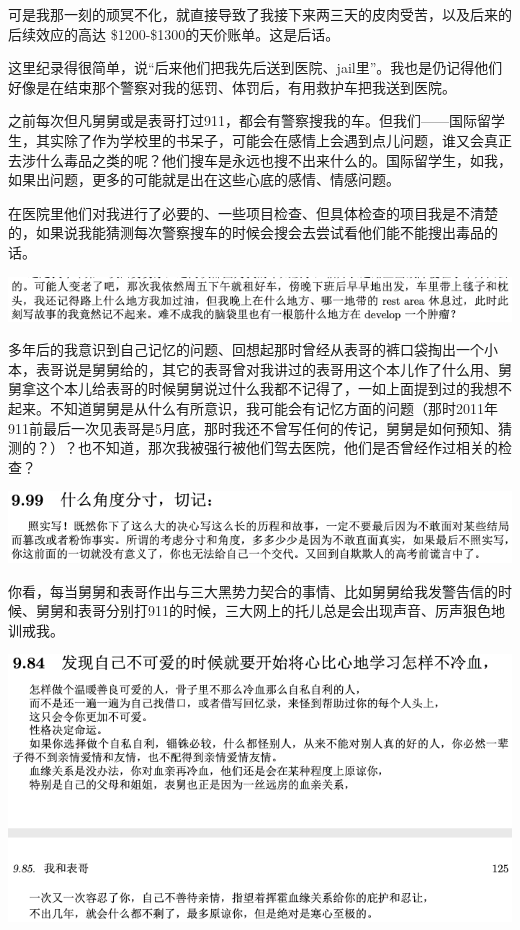 \documentclass[9pt, b5paper]{article}
\begin{document}
可是我那一刻的顽冥不化，就直接导致了我接下来两三天的皮肉受苦，以及后来的后续效应的高达 \$1200-\$1300的天价账单。这是后话。 

这里纪录得很简单，说“后来他们把我先后送到医院、jail里”。我也是仍记得他们好像是在结束那个警察对我的惩罚、体罚后，有用救护车把我送到医院。

之前每次但凡舅舅或是表哥打过911，都会有警察搜我的车。但我们——国际留学生，其实除了作为学校里的书呆子，可能会在感情上会遇到点儿问题，谁又会真正去涉什么毒品之类的呢？他们搜车是永远也搜不出来什么的。国际留学生，如我，如果出问题，更多的可能就是出在这些心底的感情、情感问题。

在医院里他们对我进行了必要的、一些项目检查、但具体检查的项目我是不清楚的，如果说我能猜测每次警察搜车的时候会搜会去尝试看他们能不能搜出毒品的话。

\begin{center}
\includegraphics[width=.9\linewidth]{./pic/p1p130-3.png}
\end{center}

多年后的我意识到自己记忆的问题、回想起那时曾经从表哥的裤口袋掏出一个小本，表哥说是舅舅给的，其它的表哥曾对我讲过的表哥用这个本儿作了什么用、舅舅拿这个本儿给表哥的时候舅舅说过什么我都不记得了，一如上面提到过的我想不起来。不知道舅舅是从什么有所意识，我可能会有记忆方面的问题（那时2011年911前最后一次见表哥是5月底，那时我还不曾写任何的传记，舅舅是如何预知、猜测的？）？也不知道，那次我被强行被他们驾去医院，他们是否曾经作过相关的检查？

\begin{center}
\includegraphics[width=.9\linewidth]{./pic/p1p131-4.png}
\end{center}

你看，每当舅舅和表哥作出与三大黑势力契合的事情、比如舅舅给我发警告信的时候、舅舅和表哥分别打911的时候，三大网上的托儿总是会出现声音、厉声狠色地训戒我。

\begin{center}
\includegraphics[width=.9\linewidth]{./pic/p1p125.png}
\end{center}
\end{document}
